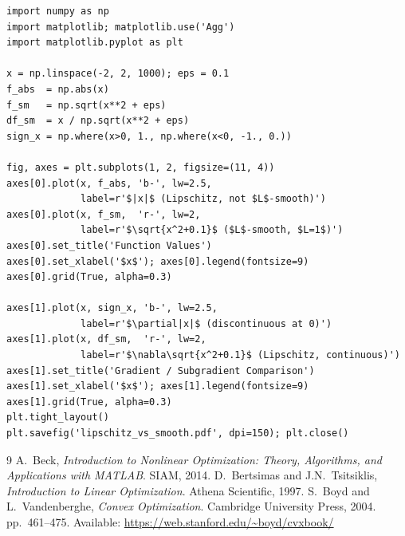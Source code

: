 \documentclass[11pt]{article}
\theoremstyle{definition}
\theoremstyle{plain}
\begin{document}
\begin{Verbatim}[fontsize=\small, label=Listing 4: Lipschitz vs L-smooth comparison,
                  frame=single, labelposition=topline]
import numpy as np
import matplotlib; matplotlib.use('Agg')
import matplotlib.pyplot as plt

x = np.linspace(-2, 2, 1000); eps = 0.1
f_abs  = np.abs(x)
f_sm   = np.sqrt(x**2 + eps)
df_sm  = x / np.sqrt(x**2 + eps)
sign_x = np.where(x>0, 1., np.where(x<0, -1., 0.))

fig, axes = plt.subplots(1, 2, figsize=(11, 4))
axes[0].plot(x, f_abs, 'b-', lw=2.5,
             label=r'$|x|$ (Lipschitz, not $L$-smooth)')
axes[0].plot(x, f_sm,  'r-', lw=2,
             label=r'$\sqrt{x^2+0.1}$ ($L$-smooth, $L=1$)')
axes[0].set_title('Function Values')
axes[0].set_xlabel('$x$'); axes[0].legend(fontsize=9)
axes[0].grid(True, alpha=0.3)

axes[1].plot(x, sign_x, 'b-', lw=2.5,
             label=r'$\partial|x|$ (discontinuous at 0)')
axes[1].plot(x, df_sm,  'r-', lw=2,
             label=r'$\nabla\sqrt{x^2+0.1}$ (Lipschitz, continuous)')
axes[1].set_title('Gradient / Subgradient Comparison')
axes[1].set_xlabel('$x$'); axes[1].legend(fontsize=9)
axes[1].grid(True, alpha=0.3)
plt.tight_layout()
plt.savefig('lipschitz_vs_smooth.pdf', dpi=150); plt.close()
\end{Verbatim}

\begin{thebibliography}{9}
  A.\ Beck, \textit{Introduction to Nonlinear Optimization: Theory, Algorithms,
  and Applications with MATLAB}. SIAM, 2014.
  D.\ Bertsimas and J.N.\ Tsitsiklis, \textit{Introduction to Linear Optimization}.
  Athena Scientific, 1997.
  S.\ Boyd and L.\ Vandenberghe, \textit{Convex Optimization}.
  Cambridge University Press, 2004. pp.\ 461--475.
  Available: \url{https://web.stanford.edu/~boyd/cvxbook/}
\end{thebibliography}
\end{document}
